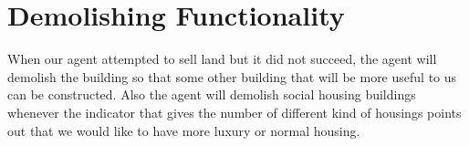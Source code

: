 \section{Demolishing Functionality}
When our agent attempted to sell land but it did not succeed, the agent will demolish the building so that some other building that will be more useful to us can be constructed. Also the agent will demolish social housing buildings whenever the indicator that gives the number of different kind of housings points out that we would like to have more luxury or normal housing. 
